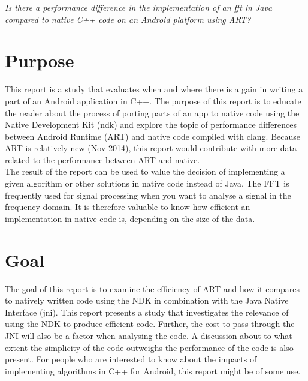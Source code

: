 
\begin{center}
    \textit{Is there a performance difference in the implementation of an \gls{fft} in Java compared to native C++ code on an Android platform using ART?}
\end{center}


\section{Purpose}
This report is a study that evaluates when and where there is a gain in writing a part of an Android application in C++. The purpose of this report is to educate the reader about the process of porting parts of an app to native code using the Native Development Kit (\gls{ndk}) and explore the topic of performance differences between Android Runtime (ART) and native code compiled with \gls{clang}. Because ART is relatively new (Nov 2014)\cite{android:dalvik:release}, this report would contribute with more data related to the performance between ART and native.\\


The result of the report can be used to value the decision of implementing a given algorithm or other solutions in native code instead of Java. The FFT is frequently used for signal processing when you want to analyse a signal in the frequency domain. It is therefore valuable to know how efficient an implementation in native code is, depending on the size of the data.

\section{Goal}
The goal of this report is to examine the efficiency of ART and how it compares to natively written code using the NDK in combination with the Java Native Interface (\gls{jni}). This report presents a study that investigates the relevance of using the NDK to produce efficient code. Further, the cost to pass through the JNI will also be a factor when analysing the code. A discussion about to what extent the simplicity of the code outweighs the performance of the code is also present. For people who are interested to know about the impacts of implementing algorithms in C++ for Android, this report might be of some use.

